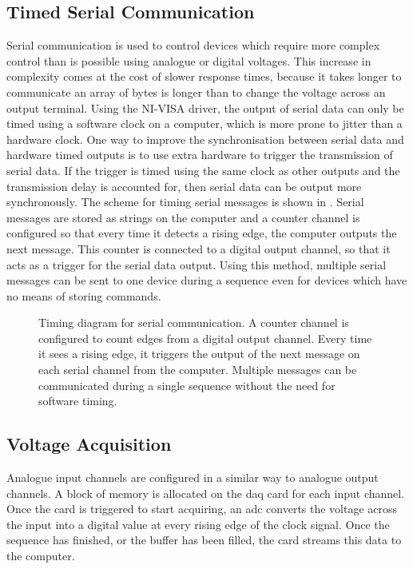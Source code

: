 \subsection{Timed Serial Communication}\label{subsec:compinterface_serial}
Serial communication is used to control devices which require more complex
control than is possible using analogue or digital voltages. This increase in
complexity comes at the cost of slower response times, because it takes
longer to communicate an array of bytes is longer than to change the voltage
across an output terminal. Using the NI-VISA driver, the output of serial
data can only be timed using a software clock on a computer, which is more
prone to jitter than a hardware clock. One way to improve the synchronisation
between serial data and hardware timed outputs is to use extra hardware to
trigger the transmission of serial data. If the trigger is timed using the
same clock as other outputs and the transmission delay is accounted for, then
serial data can be output more synchronously. The scheme for timing serial
messages is shown in . Serial messages are
stored as strings on the computer and a counter channel is configured so that
every time it detects a rising edge, the computer outputs the next message.
This counter is connected to a digital output channel, so that it acts as a
trigger for the serial data output. Using this method, multiple serial
messages can be sent to one device during a sequence even for devices which
have no means of storing commands.
\begin{figure}
    \centering
    
    \caption[Timing diagram for serial communication]{Timing diagram for
    serial communication. A counter channel is configured to count edges from
    a digital output channel. Every time it sees a rising edge, it triggers
    the output of the next message on each serial channel from the computer.
    Multiple messages can be communicated during a single sequence without
    the need for software timing.}\label{fig:serial_timing}
\end{figure} 
\subsection{Voltage Acquisition}\label{subsec:compinterface_mmacquisition}
Analogue input channels are configured in a similar way to analogue output
channels. A block of memory is allocated on the \ac{daq} card for each input
channel. Once the card is triggered to start acquiring, an \ac{adc} converts
the voltage across the input into a digital value at every rising edge of the
clock signal. Once the sequence has finished, or the buffer has been filled,
the card streams this data to the computer.
